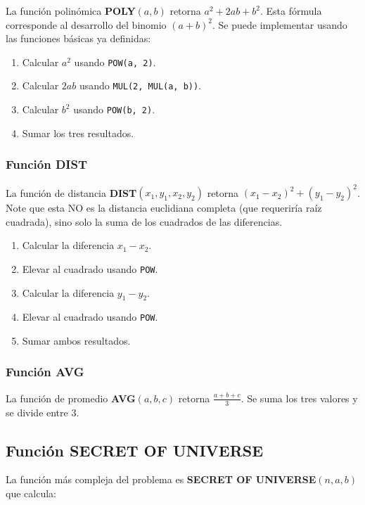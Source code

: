 \documentclass{article}
\begin{document}
La función polinómica \textbf{POLY}\((a,b)\) retorna \(a^2 + 2ab + b^2\). Esta fórmula corresponde al desarrollo del binomio \((a+b)^2\). Se puede implementar usando las funciones básicas ya definidas:

\begin{enumerate}
  \item Calcular \(a^2\) usando \texttt{POW(a, 2)}.
  \item Calcular \(2ab\) usando \texttt{MUL(2, MUL(a, b))}.
  \item Calcular \(b^2\) usando \texttt{POW(b, 2)}.
  \item Sumar los tres resultados.
\end{enumerate}

\subsubsection{Función DIST}

La función de distancia \textbf{DIST}\((x_1,y_1,x_2,y_2)\) retorna \((x_1 - x_2)^2 + (y_1 - y_2)^2\). Note que esta NO es la distancia euclidiana completa (que requeriría raíz cuadrada), sino solo la suma de los cuadrados de las diferencias.

\begin{enumerate}
  \item Calcular la diferencia \(x_1 - x_2\).
  \item Elevar al cuadrado usando \texttt{POW}.
  \item Calcular la diferencia \(y_1 - y_2\).
  \item Elevar al cuadrado usando \texttt{POW}.
  \item Sumar ambos resultados.
\end{enumerate}

\subsubsection{Función AVG}

La función de promedio \textbf{AVG}\((a,b,c)\) retorna \(\frac{a+b+c}{3}\). Se suma los tres valores y se divide entre 3.

\subsection{Función SECRET OF UNIVERSE}
\label{sec:universe}

La función más compleja del problema es \textbf{SECRET OF UNIVERSE}\((n,a,b)\) que calcula:
\end{document}
